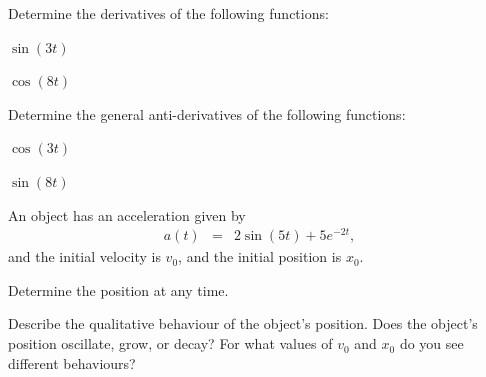 
\begin{problem}
\item Determine the derivatives of the following functions:
  \begin{subproblem}
  \item $\sin(3t)$
    \vfill
  \item $\cos(8t)$
    \vfill
  \end{subproblem}
\item Determine the general anti-derivatives of the following functions:
  \begin{subproblem}
  \item $\cos(3t)$
    \vfill
  \item $\sin(8t)$
    \vfill
  \end{subproblem}

\clearpage

\item An object has an acceleration given by
  \begin{eqnarray*}
    a(t) & = & 2\sin(5t) + 5e^{-2t},
  \end{eqnarray*}
  and the initial velocity is $v_0$, and the initial position is $x_0$.
  \begin{subproblem}
  \item Determine the position at any time.
    \vfill
  \item Describe the qualitative behaviour of the object's
    position. Does the object's position oscillate, grow, or decay?
    For what values of $v_0$ and $x_0$ do you see different
    behaviours?
    \vfill
  \end{subproblem}

\end{problem}


